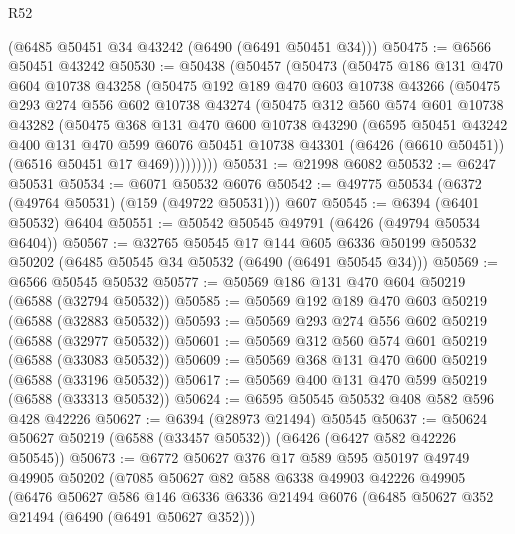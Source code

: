 \begin{lexlean}{R52}
\begin{coremodule}
    (@6485 @50451 @34 @43242 (@6490 (@6491 @50451 @34)))
@50475 := @6566 @50451 @43242
@50530 := @50438
    (@50457
      (@50473
        (@50475
          @186
          @131
          @470
          @604
          @10738
          @43258
          (@50475
            @192
            @189
            @470
            @603
            @10738
            @43266
            (@50475
              @293
              @274
              @556
              @602
              @10738
              @43274
              (@50475
                @312
                @560
                @574
                @601
                @10738
                @43282
                (@50475
                  @368
                  @131
                  @470
                  @600
                  @10738
                  @43290
                  (@6595
                    @50451
                    @43242
                    @400
                    @131
                    @470
                    @599
                    @6076
                    @50451
                    @10738
                    @43301
                    (@6426 (@6610 @50451))
                    (@6516 @50451 @17 @469)))))))))
@50531 := @21998 @6082
@50532 := @6247 @50531
@50534 := @6071 @50532 @6076
@50542 := @49775 @50534 (@6372 (@49764 @50531) (@159 (@49722 @50531))) @607
@50545 := @6394 (@6401 @50532) @6404
@50551 := @50542 @50545 @49791 (@6426 (@49794 @50534 @6404))
@50567 := @32765
    @50545
    @17
    @144
    @605
    @6336
    @50199
    @50532
    @50202
    (@6485 @50545 @34 @50532 (@6490 (@6491 @50545 @34)))
@50569 := @6566 @50545 @50532
@50577 := @50569 @186 @131 @470 @604 @50219 (@6588 (@32794 @50532))
@50585 := @50569 @192 @189 @470 @603 @50219 (@6588 (@32883 @50532))
@50593 := @50569 @293 @274 @556 @602 @50219 (@6588 (@32977 @50532))
@50601 := @50569 @312 @560 @574 @601 @50219 (@6588 (@33083 @50532))
@50609 := @50569 @368 @131 @470 @600 @50219 (@6588 (@33196 @50532))
@50617 := @50569 @400 @131 @470 @599 @50219 (@6588 (@33313 @50532))
@50624 := @6595 @50545 @50532 @408 @582 @596 @428 @42226
@50627 := @6394 (@28973 @21494) @50545
@50637 := @50624 @50627 @50219 (@6588 (@33457 @50532)) (@6426 (@6427 @582 @42226 @50545))
@50673 := @6772
    @50627
    @376
    @17
    @589
    @595
    @50197
    @49749
    @49905
    @50202
    (@7085
      @50627
      @82
      @588
      @6338
      @49903
      @42226
      @49905
      (@6476
        @50627
        @586
        @146
        @6336
        @6336
        @21494
        @6076
        (@6485 @50627 @352 @21494 (@6490 (@6491 @50627 @352)))

\end{coremodule}
\end{lexlean}
